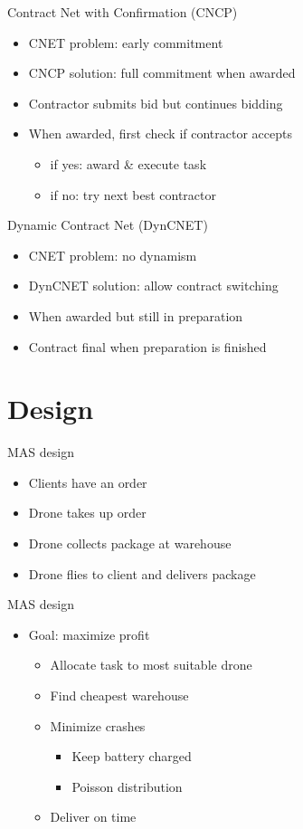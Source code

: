 \documentclass{beamer}
\begin{document}
	\begin{frame}{Contract Net with Confirmation (CNCP)}
		\begin{itemize}
			\item CNET problem: early commitment
			\item CNCP solution: full commitment when awarded
			\item Contractor submits bid but continues bidding
			\item When awarded, first check if contractor accepts
			\begin{itemize}
				\item if yes: award \& execute task
				\item if no: try next best contractor
			\end{itemize}
		\end{itemize}
	\end{frame}

	\begin{frame}{Dynamic Contract Net (DynCNET)}
		\begin{itemize}
			\item CNET problem: no dynamism
			\item DynCNET solution: allow contract switching
			\item When awarded but still in preparation
			\item Contract final when preparation is finished
		\end{itemize}
	\end{frame}
	
		
	\section{Design}
	\begin{frame}{MAS design}
		\begin{itemize}
			\item Clients have an order
			\item Drone takes up order
			\item Drone collects package at warehouse
			\item Drone flies to client and delivers package
		\end{itemize}
	\end{frame}
	
	\begin{frame}{MAS design}
		\begin{itemize}
			\item Goal: maximize profit
			\begin{itemize}
				\item Allocate task to most suitable drone
				\item Find cheapest warehouse
				\item Minimize crashes
				\begin{itemize}
					\item Keep battery charged
					\item Poisson distribution
				\end{itemize}
				\item Deliver on time
			\end{itemize}
		\end{itemize}
	\end{frame}
	
\end{document}
